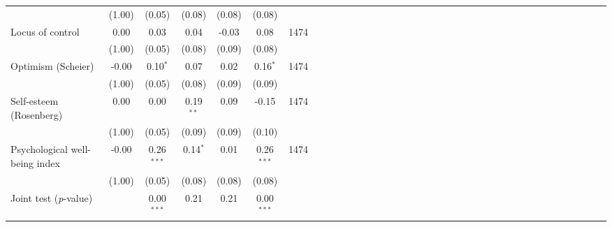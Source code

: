 {\begin{tabular}{l*{6}{SSSSSc}}
          &   (1.00)&   (0.05)&   (0.08)&   (0.08)&   (0.08)&         \\
Locus of control&     0.00&     0.03&     0.04&    -0.03&     0.08&     1474\\
          &   (1.00)&   (0.05)&   (0.08)&   (0.09)&   (0.08)&         \\
Optimism (Scheier)&    -0.00&0.10$^{*}$&     0.07&     0.02&0.16$^{*}$&     1474\\
          &   (1.00)&   (0.05)&   (0.08)&   (0.09)&   (0.09)&         \\
Self-esteem (Rosenberg)&     0.00&     0.00&0.19$^{**}$&     0.09&    -0.15&     1474\\
          &   (1.00)&   (0.05)&   (0.09)&   (0.09)&   (0.10)&         \\
Psychological well-being index&    -0.00&0.26$^{***}$&0.14$^{*}$&     0.01&0.26$^{***}$&     1474\\
          &   (1.00)&   (0.05)&   (0.08)&   (0.08)&   (0.08)&         \\
\midrule Joint test (\emph{p}-value)&         &0.00$^{***}$&     0.21&     0.21&0.00$^{***}$&         \\
\bottomrule
\end{tabular}
}
